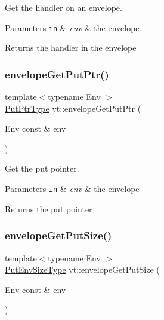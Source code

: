 Get the handler on an envelope. 


\begin{DoxyParams}[1]{Parameters}
\mbox{\tt in}  & {\em env} & the envelope\\
\hline
\end{DoxyParams}
\begin{DoxyReturn}{Returns}
the handler in the envelope 
\end{DoxyReturn}
\mbox{\label{namespacevt_a56ab014300930ba8ffc902793035eca2}} 
\subsubsection{\texorpdfstring{envelope\+Get\+Put\+Ptr()}{envelopeGetPutPtr()}}
{\footnotesize\ttfamily template$<$typename Env $>$ \\
\hyperlink{namespacevt_a537693bfe0223c71eb52bdbd6ea2c741}{Put\+Ptr\+Type} vt\+::envelope\+Get\+Put\+Ptr (\begin{DoxyParamCaption}\item[{Env const \&}]{env }\end{DoxyParamCaption})\hspace{0.3cm}{\ttfamily [inline]}}



Get the put pointer. 


\begin{DoxyParams}[1]{Parameters}
\mbox{\tt in}  & {\em env} & the envelope\\
\hline
\end{DoxyParams}
\begin{DoxyReturn}{Returns}
the put pointer 
\end{DoxyReturn}
\mbox{\label{namespacevt_abbd3e4684f30ad052e43a1655f540b6f}} 
\subsubsection{\texorpdfstring{envelope\+Get\+Put\+Size()}{envelopeGetPutSize()}}
{\footnotesize\ttfamily template$<$typename Env $>$ \\
\hyperlink{namespacevt_aa241444e21c15238e185923792814fe4}{Put\+Env\+Size\+Type} vt\+::envelope\+Get\+Put\+Size (\begin{DoxyParamCaption}\item[{Env const \&}]{env }\end{DoxyParamCaption})\hspace{0.3cm}{\ttfamily [inline]}}




